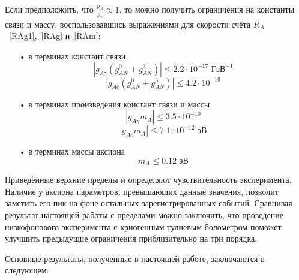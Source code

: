 \documentclass[a4paper,article,14pt]{extarticle}
\begin{document}
Если предположить, что $\frac{p_A}{p_\gamma} \approx 1$, то можно получить ограничения на константы связи и массу, воспользовавшись выражениями для скорости счёта ${R_A}$~\eqref{RAg1},~\eqref{RAg} и~\eqref{RAm}:

\begin{enumerate}
    \item[•] в терминах констант связи
          \begin{equation}
              \left| g_{A\gamma}{\left( {g_{AN}^0 + g_{AN}^3} \right)} \right| \leqslant 2.2 \cdot 10^{-17} \text{ ГэВ}^{-1}
          \end{equation}
          \begin{equation}
              \left| g_{Ae}{\left( {g_{AN}^0 + g_{AN}^3} \right)} \right| \leqslant 4.2 \cdot 10^{-19}
          \end{equation}
    \item[•] в терминах произведения констант связи и массы
          \begin{equation}
              \left| {{g_{A\gamma}}{m_A}} \right| \leqslant 3.5 \cdot 10^{-10}
          \end{equation}
          \begin{equation}
              \left| {{g_{Ae}}{m_A}} \right| \leqslant 7.1 \cdot 10^{-12} \text{ эВ}
          \end{equation}
    \item[•] в терминах массы аксиона
          \begin{equation}
              m_A \leqslant 0.12 \text{ эВ}
          \end{equation}
\end{enumerate}

Приведённые верхние пределы и определяют чувствительность эксперимента.
Наличие у аксиона параметров, превышающих данные значения, позволит заметить его пик на фоне остальных зарегистрированных событий.
Сравнивая результат настоящей работы с пределами \cite{newlimits_tm} можно заключить, что проведение низкофонового эксперимента с криогенным тулиевым болометром поможет улучшить предыдущие ограничения приблизительно на три порядка.

Основные результаты, полученные в настоящей работе, заключаются в следующем:
\end{document}
